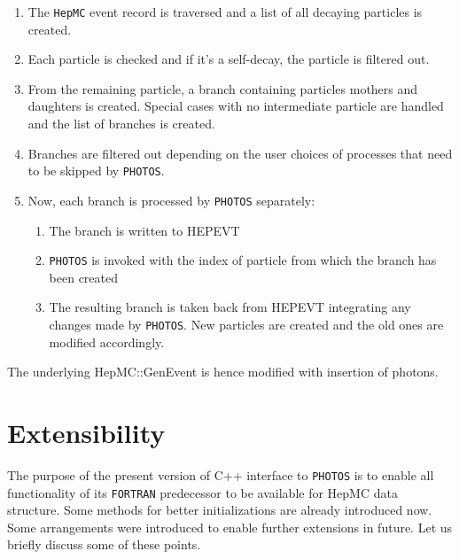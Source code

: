 \documentclass[]{Photos_interface_design}
\begin{document}
\begin{enumerate}
\item The {\tt HepMC} event record is traversed and a list of all decaying
      particles is created.
\item Each particle is checked and if it's a self-decay, the particle is filtered out.
\item From the remaining particle, a branch containing particles mothers and daughters
      is created. Special cases with no intermediate particle are handled and the
	  list of branches is created.
\item Branches are filtered out depending on the user choices of processes
      that need to be skipped by {\tt PHOTOS}.
\item Now, each branch is processed by {\tt PHOTOS} separately:

	\begin{enumerate}
  
	\item The branch is written to HEPEVT
	\item {\tt PHOTOS} is invoked with the index of particle from which the branch
	      has been created
	\item The resulting branch is taken back from HEPEVT integrating any changes
	      made by {\tt PHOTOS}. New particles are created and the old ones are modified
		  accordingly.

	\end{enumerate}

\end{enumerate}

The underlying HepMC::GenEvent is hence modified with insertion of photons.

\section{Extensibility}
 The purpose of the present version of C++ interface to {\tt PHOTOS} is to enable 
all functionality of its {\tt FORTRAN} predecessor to be available for HepMC data
structure. Some methods for better initializations are already introduced
now. Some arrangements were introduced to enable further
extensions in future. Let us briefly discuss some of these points.
 
\end{document}
